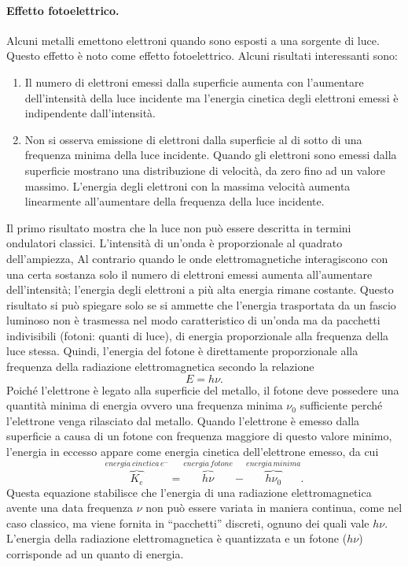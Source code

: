\paragraph{Effetto fotoelettrico.} Alcuni metalli emettono elettroni quando sono esposti a una sorgente di luce. Questo effetto è noto come effetto fotoelettrico. Alcuni risultati interessanti sono:
\begin{enumerate}
    \item Il numero di elettroni emessi dalla superficie aumenta con l'aumentare dell'intensità della luce incidente ma l'energia cinetica degli elettroni emessi è indipendente dall'intensità.
    \item Non si osserva emissione di elettroni dalla superficie al di sotto di una frequenza minima della luce incidente. Quando gli elettroni sono emessi dalla superficie mostrano una distribuzione di velocità, da zero fino ad un valore massimo. L'energia degli elettroni con la massima velocità aumenta linearmente all'aumentare della frequenza della luce incidente.
\end{enumerate}
Il primo risultato mostra che la luce non può essere descritta in termini ondulatori classici. L'intensità di un'onda è proporzionale al quadrato dell'ampiezza, Al contrario quando le onde elettromagnetiche interagiscono con una certa sostanza solo il numero di elettroni emessi aumenta all'aumentare dell'intensità; l'energia degli elettroni a più alta energia rimane costante. Questo risultato si può spiegare solo se si ammette che l'energia trasportata da un fascio luminoso non è trasmessa nel modo caratteristico di un'onda ma da pacchetti indivisibili (fotoni: quanti di luce), di energia proporzionale alla frequenza della luce stessa. Quindi, l'energia del fotone è direttamente proporzionale alla frequenza della radiazione elettromagnetica secondo la relazione 
\begin{equation}
    E=h\nu.
\end{equation}
Poiché l'elettrone è legato alla superficie del metallo, il fotone deve possedere una quantità minima di energia ovvero una frequenza minima $\nu_0$ sufficiente perché l'elettrone venga rilasciato dal metallo. Quando l'elettrone è emesso dalla superficie a causa di un fotone con frequenza maggiore di questo valore minimo, l'energia in eccesso appare come energia cinetica dell'elettrone emesso, da cui
\begin{equation}
    \overbrace{K_e}^{energia\,cinetica\,e^{-}}=\overbrace{h\nu}^{energia\,fotone}-\overbrace{h\nu_0}^{energia\,minima}.
\end{equation}
Questa equazione stabilisce che l'energia di una radiazione elettromagnetica avente una data frequenza $\nu$ non può essere variata in maniera continua, come nel caso classico, ma viene fornita in “pacchetti” discreti, ognuno dei quali vale $h\nu$. L'energia della radiazione elettromagnetica è quantizzata e un fotone ($h\nu$) corrisponde ad un quanto di energia.

